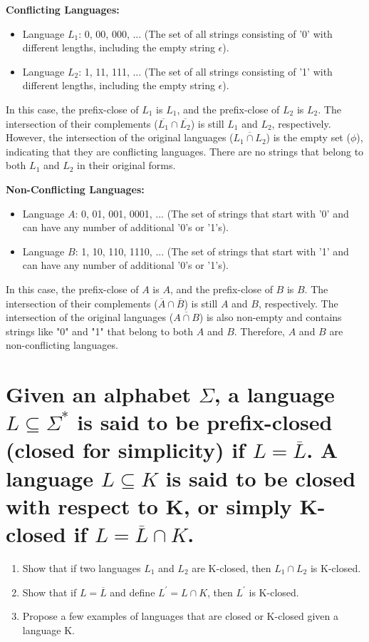 \documentclass{article}
\begin{document}
\textbf{Conflicting Languages:}

\begin{itemize}
  \item Language $L_1$: {0, 00, 000, ...} (The set of all strings consisting of '0' with different lengths, including the empty string $\epsilon$).
  \item Language $L_2$: {1, 11, 111, ...} (The set of all strings consisting of '1' with different lengths, including the empty string $\epsilon$).
\end{itemize}

In this case, the prefix-close of $L_1$ is $L_1$, and the prefix-close of $L_2$ is $L_2$. The intersection of their complements ($\overline{L_1} \cap \overline{L_2}$) is still $L_1$ and $L_2$, respectively. However, the intersection of the original languages ($\overline{L_1 \cap L_2}$) is the empty set ($\phi $), indicating that they are conflicting languages. There are no strings that belong to both $L_1$ and $L_2$ in their original forms.

\textbf{Non-Conflicting Languages:}

\begin{itemize}
  \item Language $A$: {0, 01, 001, 0001, ...} (The set of strings that start with '0' and can have any number of additional '0's or '1's).
  \item Language $B$: {1, 10, 110, 1110, ...} (The set of strings that start with '1' and can have any number of additional '0's or '1's).
\end{itemize}

In this case, the prefix-close of $A$ is $A$, and the prefix-close of $B$ is $B$. The intersection of their complements ($\overline{A} \cap \overline{B}$) is still $A$ and $B$, respectively. The intersection of the original languages ($\overline{A \cap B}$) is also non-empty and contains strings like "0" and "1" that belong to both $A$ and $B$. Therefore, $A$ and $B$ are non-conflicting languages.


\section{Given an alphabet $\Sigma$, a language $L \subseteq  \Sigma^*$ is said to be prefix-closed (closed for simplicity) if $L = \overline{L}$. A language $L \subseteq  K$ is said to be closed with respect to K, or simply K-closed if $L = \overline{L} \cap K$.}

\begin{enumerate}[label=(\alph*)]
  \item Show that if two languages $L_1$ and $L_2$ are K-closed, then $L_1 \cap L_2$ is K-closed.
  \item Show that if $L = \overline{L}$ and define $L^\prime  = L \cap K$, then $L^\prime$ is K-closed.
  \item Propose a few examples of languages that are closed or K-closed given a language K.
\end{enumerate}
\end{document}
